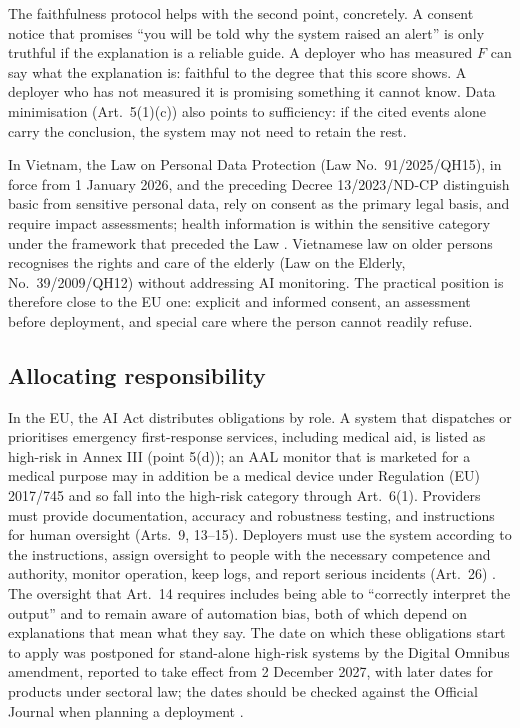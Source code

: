 \documentclass[11pt,a4paper]{article}
\begin{document}
The faithfulness protocol helps with the second point, concretely. A consent notice that promises ``you will be told why the system raised an alert'' is only truthful if the explanation is a reliable guide. A deployer who has measured $F$ can say what the explanation is: faithful to the degree that this score shows. A deployer who has not measured it is promising something it cannot know. Data minimisation (Art.~5(1)(c)) also points to sufficiency: if the cited events alone carry the conclusion, the system may not need to retain the rest.

In Vietnam, the Law on Personal Data Protection (Law No.~91/2025/QH15), in force from 1 January 2026, and the preceding Decree 13/2023/ND-CP distinguish basic from sensitive personal data, rely on consent as the primary legal basis, and require impact assessments; health information is within the sensitive category under the framework that preceded the Law \cite{vn_pdpl}. Vietnamese law on older persons recognises the rights and care of the elderly (Law on the Elderly, No.~39/2009/QH12) without addressing AI monitoring. The practical position is therefore close to the EU one: explicit and informed consent, an assessment before deployment, and special care where the person cannot readily refuse.

\subsection{Allocating responsibility}
In the EU, the AI Act distributes obligations by role. A system that dispatches or prioritises emergency first-response services, including medical aid, is listed as high-risk in Annex III (point 5(d)); an AAL monitor that is marketed for a medical purpose may in addition be a medical device under Regulation (EU) 2017/745 and so fall into the high-risk category through Art.~6(1). Providers must provide documentation, accuracy and robustness testing, and instructions for human oversight (Arts.~9, 13--15). Deployers must use the system according to the instructions, assign oversight to people with the necessary competence and authority, monitor operation, keep logs, and report serious incidents (Art.~26) \cite{aiact}. The oversight that Art.~14 requires includes being able to ``correctly interpret the output'' and to remain aware of automation bias, both of which depend on explanations that mean what they say. The date on which these obligations start to apply was postponed for stand-alone high-risk systems by the Digital Omnibus amendment, reported to take effect from 2 December 2027, with later dates for products under sectoral law; the dates should be checked against the Official Journal when planning a deployment \cite{omnibus}.
\end{document}

